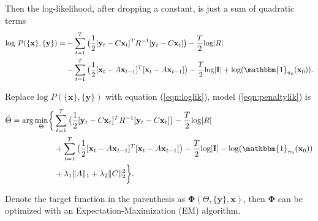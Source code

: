 \documentclass[fleqn]{article}
\let\oldref\ref
\renewcommand{\ref}[1]{(\oldref{#1})}
\newcommand{\T}{T}
\begin{document}
Then the log-likelihood, after dropping a constant, is just a sum of quadratic terms
\begin{equation}\label{eqn:loglik}
\begin{split}
\text{log } P(\{\mathbf{x}\},\{\mathbf{y}\})=&-\sum\limits_{t=1}^{T}\big(\frac{1}{2}[\mathbf{y}_t-C\mathbf{x}_t]^{\T}R^{-1}[\mathbf{y}_t-C\mathbf{x}_t]\big)-\frac{T}{2}\text{log}|R|\\
&-\sum\limits_{t=1}^{T}\big(\frac{1}{2}[\mathbf{x}_t-A\mathbf{x}_{t-1}]^{\T}[\mathbf{x}_t-A\mathbf{x}_{t-1}]\big)-\frac{T}{2}\text{log}|\mathbf{I}|+ \text{log}(\mathbbm{1}_{\mathbf{\pi}_0}(\mathbf{x}_0)).
\end{split}
\end{equation}

Replace $\text{log } P(\{\mathbf{x}\},\{\mathbf{y}\})$ with equation \ref{eqn:loglik}, model \ref{eqn:penaltylik} is
\begin{equation}\label{eqn:penaltylik2}
\begin{split}
\hat{\Theta}=\text{arg}\min_{\substack{\Theta}}\biggl\{&\sum\limits_{t=1}^{T}\big(\frac{1}{2}[\mathbf{y}_t-C\mathbf{x}_t]^{\T}R^{-1}[\mathbf{y}_t-C\mathbf{x}_t]\big)-\frac{T}{2}\text{log}|R|\\
&+\sum\limits_{t=1}^{T}\big(\frac{1}{2}[\mathbf{x}_t-A\mathbf{x}_{t-1}]^{\T}[\mathbf{x}_t-A\mathbf{x}_{t-1}]\big)-\frac{T}{2}\text{log}|\mathbf{I}| - \text{log}(\mathbbm{1}_{\mathbf{\pi}_0}(\mathbf{x}_0))\\
&+\lambda_1\|A\|_1+\lambda_2\|C\|_2^2\biggr\}.
\end{split}
\end{equation}

Denote the target function in the parenthesis as $\mathbf{\Phi}(\Theta,\{\mathbf{y}\},\mathbf{x})$, then $\mathbf{\Phi}$ can be optimized with an Expectation-Maximization (EM) algorithm.
\end{document}
